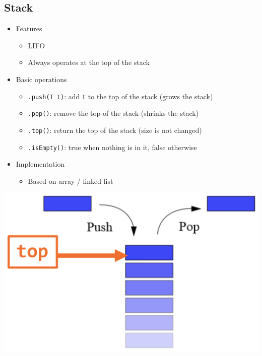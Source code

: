 \documentclass[10pt]{article}
\begin{document}
\subsection*{Stack}
\begin{itemize}
    \item Features
    \begin{itemize}
        \item LIFO
        \item Always operates at the top of the stack
    \end{itemize}
    \item Basic operations
    \begin{itemize}
        \item \texttt{.push(T t)}: add \texttt{t} to the top of the stack (grows the stack)
        \item \texttt{.pop()}: remove the top of the stack (shrinks the stack)
        \item \texttt{.top()}: return the top of the stack (size is not changed)
        \item \texttt{.isEmpty()}: true when nothing is in it, false otherwise
    \end{itemize}
    \item Implementation
    \begin{itemize}
        \item Based on array / linked list
    \end{itemize}
\end{itemize}
\begin{center}
\includegraphics[width=\textwidth/3]{images/3.png}
\end{center}
\end{document}
